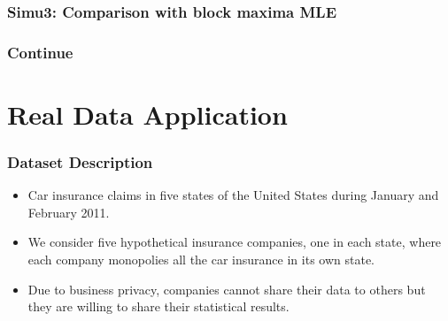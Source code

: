\documentclass{beamer}
\begin{document}
\begin{frame}
    \frametitle{Simu3: Comparison with block maxima MLE}
    \begin{figure}[htbp]
        \centering
        \end{figure}

    

\end{frame}

\begin{frame}
    \frametitle{Continue}
    \begin{figure}[htbp]
        \centering
        \end{figure}
    

\end{frame}
\section{Real Data Application}
\begin{frame}
    \frametitle{Dataset Description}
\begin{itemize}
    \item Car insurance claims in five states of the United States during January and February 2011.
    \bigskip
    \item We consider five hypothetical insurance companies, one in each state, where each company monopolies all the car insurance in its own state.
    \bigskip
    \item Due to business privacy, companies cannot share their data to others but they are willing to share their statistical results.
\end{itemize}
    

\end{frame}
\end{document}
